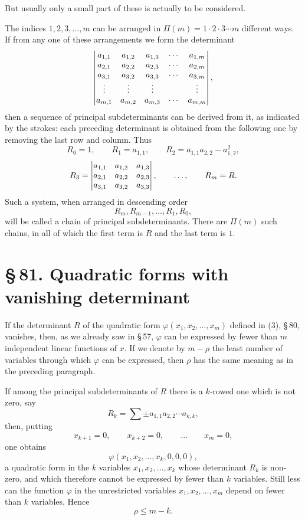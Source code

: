 \documentclass[11pt]{article}
\providecommand{\sect}[2]{\section*{\S\,#1. #2}}
\begin{document}
But usually only a small part of these is actually to be considered.

The indices $1,2,3,\ldots,m$ can be arranged in $\Pi(m)=1\cdot2\cdot3\cdots m$ different ways. If from any one of these arrangements we form the determinant
\[
\begin{vmatrix}
 a_{1,1} & a_{1,2} & a_{1,3} & \cdots & a_{1,m}\cr
 a_{2,1} & a_{2,2} & a_{2,3} & \cdots & a_{2,m}\cr
 a_{3,1} & a_{3,2} & a_{3,3} & \cdots & a_{3,m}\cr
 \vdots  & \vdots  & \vdots  &        & \vdots\cr
 a_{m,1} & a_{m,2} & a_{m,3} & \cdots & a_{m,m}
\end{vmatrix},
\]
then a sequence of principal subdeterminants can be derived from it, as indicated by the strokes: each preceding determinant is obtained from the following one by removing the last row and column. Thus
\[
        R_0=1,
        \qquad R_1=a_{1,1},
        \qquad R_2=a_{1,1}a_{2,2}-a_{1,2}^2,
\]
\[
        R_3=\begin{vmatrix}
        a_{1,1}&a_{1,2}&a_{1,3}\cr
        a_{2,1}&a_{2,2}&a_{2,3}\cr
        a_{3,1}&a_{3,2}&a_{3,3}
        \end{vmatrix},
        \qquad\ldots,
        \qquad R_m=R.
\]
Such a system, when arranged in descending order
\[
        R_m,R_{m-1},\ldots,R_1,R_0,
\]
will be called a chain of principal subdeterminants. There are $\Pi(m)$ such chains, in all of which the first term is $R$ and the last term is $1$.

\sect{81}{Quadratic forms with vanishing determinant}

If the determinant $R$ of the quadratic form $\varphi(x_1,x_2,\ldots,x_m)$ defined in (3), \S\,80, vanishes, then, as we already saw in \S\,57, $\varphi$ can be expressed by fewer than $m$ independent linear functions of $x$. If we denote by $m-\rho$ the least number of variables through which $\varphi$ can be expressed, then $\rho$ has the same meaning as in the preceding paragraph.

If among the principal subdeterminants of $R$ there is a $k$-rowed one which is not zero, say
\[
        R_k=\sum \pm a_{1,1}a_{2,2}\cdots a_{k,k},
\]
then, putting
\[
        x_{k+1}=0,
        \qquad x_{k+2}=0,
        \qquad\ldots\qquad x_m=0,
\]
one obtains
\[
        \varphi(x_1,x_2,\ldots,x_k,0,0,0),
\]
a quadratic form in the $k$ variables $x_1,x_2,\ldots,x_k$ whose determinant $R_k$ is non-zero, and which therefore cannot be expressed by fewer than $k$ variables. Still less can the function $\varphi$ in the unrestricted variables $x_1,x_2,\ldots,x_m$ depend on fewer than $k$ variables. Hence
\begin{equation}
        \rho\leq m-k.
\tag{1}
\end{equation}
\end{document}
